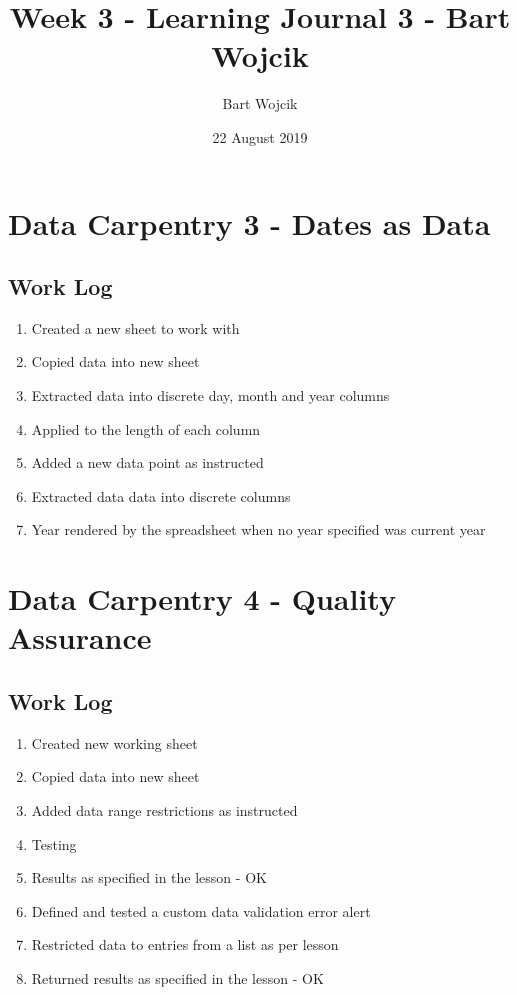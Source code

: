 \documentclass{article}
\title{Week 3 - Learning Journal 3  - Bart Wojcik}
\author{Bart Wojcik}
\date{22 August 2019}
\begin{document}
\maketitle

\section{Data Carpentry 3 - Dates as Data}
\subsection{Work Log}
\begin{enumerate}
    \item Created a new sheet to work with
    \item Copied data into new sheet
    \item Extracted data into discrete day, month and year columns
    \item Applied to the length of each column
    \item Added a new data point as instructed
    \item Extracted data data into discrete columns
    \item Year rendered by the spreadsheet when no year specified was current year
\end{enumerate}

\section{Data Carpentry 4 - Quality Assurance}
\subsection{Work Log}
\begin{enumerate}
    \item Created new working sheet
    \item Copied data into new sheet
    \item Added data range restrictions as instructed
    \item Testing
    \item Results as specified in the lesson - OK
    \item Defined and tested a custom data validation error alert
    \item Restricted data to entries from a list as per lesson
    \item Returned results as specified in the lesson - OK
\end{enumerate}
\end{document}

